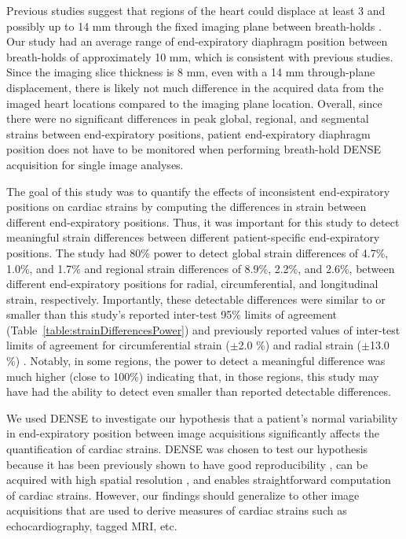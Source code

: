 	Previous studies suggest that regions of the heart could displace at least 3 and possibly up to 14 mm through the fixed imaging plane between breath-holds \cite{Slomka2007,Swingen2003,Wang1995b,McLeish2002}. Our study had an average range of end-expiratory diaphragm position between breath-holds of approximately 10 mm, which is consistent with previous studies. Since the imaging slice thickness is 8 mm, even with a 14 mm through-plane displacement, there is likely not much difference in the acquired data from the imaged heart locations compared to the imaging plane location. Overall, since there were no significant differences in peak global, regional, and segmental strains between end-expiratory positions, patient end-expiratory diaphragm position does not have to be monitored when performing breath-hold DENSE acquisition for single image analyses.
	
	The goal of this study was to quantify the effects of inconsistent end-expiratory positions on cardiac strains by computing the differences in strain between different end-expiratory positions. Thus, it was important for this study to detect meaningful strain differences between different patient-specific end-expiratory positions. The study had 80\% power to detect global strain differences of 4.7\%, 1.0\%, and 1.7\% and regional strain differences of 8.9\%, 2.2\%, and 2.6\%, between different end-expiratory positions for radial, circumferential, and longitudinal strain, respectively. Importantly, these detectable differences were similar to or smaller than this study's reported inter-test 95\% limits of agreement (Table~\ref{table:strainDifferencesPower}) and previously reported values of inter-test limits of agreement for circumferential strain ($\pm$2.0 \%) and radial strain ($\pm$13.0 \%) \cite{Wehner2015a}. Notably, in some regions, the power to detect a meaningful difference was much higher (close to 100\%) indicating that, in those regions, this study may have had the ability to detect even smaller than reported detectable differences.
	
	We used DENSE to investigate our hypothesis that a patient's normal variability in end-expiratory position between image acquisitions significantly affects the quantification of cardiac strains. DENSE was chosen to test our hypothesis because it has been previously shown to have good reproducibility \cite{Haggerty2013}, can be acquired with high spatial resolution \cite{Aletras1999b,Aletras1999c}, and enables straightforward computation of cardiac strains. However, our findings should generalize to other image acquisitions that are used to derive measures of cardiac strains such as echocardiography, tagged MRI, etc.

